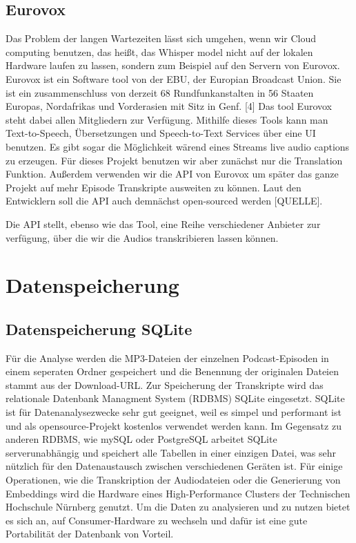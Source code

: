 \subsection{Eurovox}

Das Problem der langen Wartezeiten lässt sich umgehen, wenn wir Cloud computing benutzen, das heißt, das Whisper model nicht auf der lokalen Hardware laufen zu lassen, sondern zum Beispiel auf den Servern von Eurovox. 
Eurovox ist ein Software tool von der EBU, der Europian Broadcast Union. 
Sie ist ein zusammenschluss von derzeit 68 Rundfunkanstalten in 56 Staaten Europas, Nordafrikas und Vorderasien mit Sitz in Genf. [4] 
Das tool Eurovox steht dabei allen Mitgliedern zur Verfügung.  
Mithilfe dieses Tools kann man Text-to-Speech, Übersetzungen und Speech-to-Text Services über eine UI benutzen. 
Es gibt sogar die Möglichkeit wärend eines Streams live audio captions zu erzeugen. 
Für dieses Projekt benutzen wir aber zunächst nur die Translation Funktion. 
Außerdem verwenden wir die API von Eurovox um später das ganze Projekt auf mehr Episode Transkripte ausweiten zu können. 
Laut den Entwicklern soll die API auch demnächst open-sourced werden [QUELLE].

Die API stellt, ebenso wie das Tool, eine Reihe verschiedener Anbieter zur verfügung, über die wir die Audios transkribieren lassen können. 


\section{Datenspeicherung}

\subsection{Datenspeicherung SQLite}

Für die Analyse werden die MP3-Dateien der einzelnen Podcast-Episoden in einem seperaten Ordner gespeichert und die Benennung der originalen Dateien stammt aus der Download-URL.
Zur Speicherung der Transkripte wird das relationale Datenbank Managment System (RDBMS) SQLite  eingesetzt. SQLite ist für Datenanalysezwecke sehr gut geeignet, weil es simpel und performant ist und als opensource-Projekt kostenlos verwendet werden kann.
Im Gegensatz zu anderen RDBMS, wie mySQL oder PostgreSQL arbeitet SQLite serverunabhängig und speichert alle Tabellen in einer einzigen Datei, was sehr nützlich für den Datenaustausch zwischen verschiedenen Geräten ist.
Für einige Operationen, wie die Transkription der Audiodateien oder die Generierung von Embeddings wird die Hardware eines High-Performance Clusters der Technischen Hochschule Nürnberg genutzt. 
Um die Daten zu analysieren und zu nutzen bietet es sich an, auf Consumer-Hardware zu wechseln und dafür ist eine gute Portabilität der Datenbank von Vorteil.

